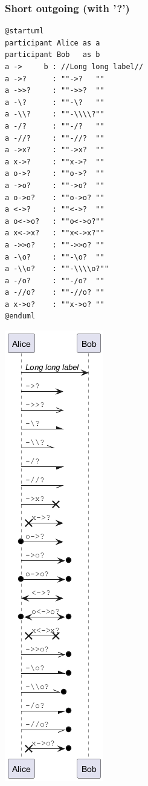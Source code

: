 \subsubsection{Short outgoing (with '?')}
\begin{verbatim}
@startuml
participant Alice as a
participant Bob   as b
a ->     b : //Long long label//
a ->?      : ""->?   ""
a ->>?     : ""->>?  ""
a -\?      : ""-\?   ""
a -\\?     : ""-\\\\?""
a -/?      : ""-/?   ""
a -//?     : ""-//?  ""
a ->x?     : ""->x?  ""
a x->?     : ""x->?  ""
a o->?     : ""o->?  ""
a ->o?     : ""->o?  ""
a o->o?    : ""o->o? ""
a <->?     : ""<->?  ""
a o<->o?   : ""o<->o?""
a x<->x?   : ""x<->x?""
a ->>o?    : ""->>o? ""
a -\o?     : ""-\o?  ""
a -\\o?    : ""-\\\\o?""
a -/o?     : ""-/o?  ""
a -//o?    : ""-//o? ""
a x->o?    : ""x->o? ""
@enduml
\end{verbatim}
\begin{center}
\includegraphics[scale=0.60]{imgw/img-132305d4d41328d264093aaa08efb379.png}
\end{center}
%
%
